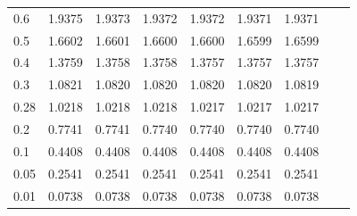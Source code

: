 \begin{landscape}
\begin{table}
\begin{center}
\begin{tabular}{l|rrrrrrrr}
0.6 & 1.9375 & 1.9373 & 1.9372 & 1.9372 & 1.9371 & 1.9371  \\ 
0.5 & 1.6602 & 1.6601 & 1.6600 & 1.6600 & 1.6599 & 1.6599  \\ 
0.4 & 1.3759 & 1.3758 & 1.3758 & 1.3757 & 1.3757 & 1.3757  \\ 
0.3 & 1.0821 & 1.0820 & 1.0820 & 1.0820 & 1.0820 & 1.0819  \\ 
0.28 & 1.0218 & 1.0218 & 1.0218 & 1.0217 & 1.0217 & 1.0217  \\ 
0.2 & 0.7741 & 0.7741 & 0.7740 & 0.7740 & 0.7740 & 0.7740  \\ 
0.1 & 0.4408 & 0.4408 & 0.4408 & 0.4408 & 0.4408 & 0.4408  \\ 
0.05 & 0.2541 & 0.2541 & 0.2541 & 0.2541 & 0.2541 & 0.2541  \\ 
0.01 & 0.0738 & 0.0738 & 0.0738 & 0.0738 & 0.0738 & 0.0738  \\ 
\hline \hline
\end{tabular}
\end{center}
\end{table}
\end{landscape}







